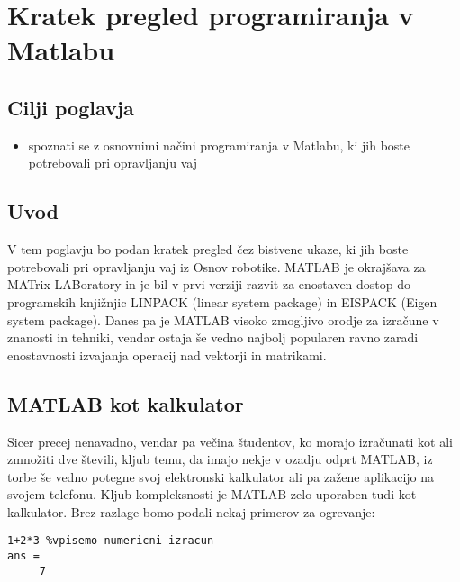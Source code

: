 
\chapter{{Kratek pregled programiranja v Matlabu}}

\vspace{-3.35cm}

\begin{mdframed}[backgroundcolor=green!20, shadow=true,roundcorner=8pt]
\vspace{-0.35cm}
\section{Cilji poglavja}
\begin{itemize}
\item spoznati se z osnovnimi načini programiranja v Matlabu, ki jih boste potrebovali pri opravljanju vaj
\end{itemize}
\end{mdframed}


\section{Uvod}

V tem poglavju bo podan kratek pregled čez bistvene ukaze, ki jih boste potrebovali pri opravljanju vaj iz Osnov robotike. MATLAB je okrajšava za MATrix LABoratory in je bil v prvi verziji razvit za enostaven dostop do programskih knjižnjic LINPACK (linear system package) in EISPACK (Eigen system package). Danes pa je MATLAB visoko zmogljivo orodje za izračune v znanosti in tehniki, vendar ostaja še vedno najbolj popularen ravno zaradi enostavnosti izvajanja operacij nad vektorji in matrikami.

\section{MATLAB kot kalkulator}

Sicer precej nenavadno, vendar pa večina študentov, ko morajo izračunati kot ali zmnožiti dve števili, kljub temu, da imajo nekje v ozadju odprt MATLAB, iz torbe še vedno potegne svoj elektronski kalkulator ali pa zažene aplikacijo na svojem telefonu. Kljub kompleksnosti je MATLAB zelo uporaben tudi kot kalkulator. Brez razlage bomo podali nekaj primerov za ogrevanje:

\begin{lstlisting} 
1+2*3 %vpisemo numericni izracun
ans =
     7
\end{lstlisting}



